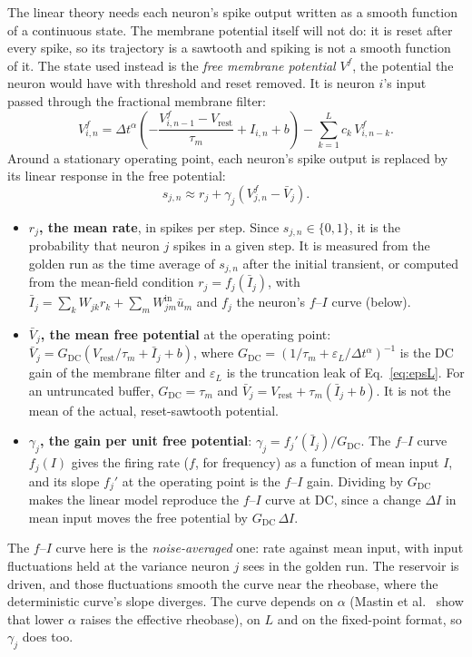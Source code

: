 \documentclass[11pt,a4paper]{article}
\begin{document}
The linear theory needs each neuron's spike output written as a smooth function of a continuous state. The membrane potential itself will not do: it is reset after every spike, so its trajectory is a sawtooth and spiking is not a smooth function of it. The state used instead is the \emph{free membrane potential} $V^{f}$, the potential the neuron would have with threshold and reset removed. It is neuron $i$'s input passed through the fractional membrane filter:
\begin{equation}
V^{f}_{i,n} = \Delta t^{\alpha}\left( -\frac{V^{f}_{i,n-1} - V_{\mathrm{rest}}}{\tau_m} + I_{i,n} + b \right) - \sum_{k=1}^{L} c_k \, V^{f}_{i,n-k}.
\label{eq:vfree}
\end{equation}
Around a stationary operating point, each neuron's spike output is replaced by its linear response in the free potential:
\begin{equation}
s_{j,n} \approx r_j + \gamma_j \left( V^{f}_{j,n} - \bar V_j \right).
\label{eq:spikelin}
\end{equation}
\begin{itemize}
  \item \textbf{$r_j$, the mean rate}, in spikes per step. Since $s_{j,n} \in \{0,1\}$, it is the probability that neuron $j$ spikes in a given step. It is measured from the golden run as the time average of $s_{j,n}$ after the initial transient, or computed from the mean-field condition $r_j = f_j(\bar I_j)$, with $\bar I_j = \sum_k W_{jk} r_k + \sum_m W^{\mathrm{in}}_{jm} \bar u_m$ and $f_j$ the neuron's $f$--$I$ curve (below).
  \item \textbf{$\bar V_j$, the mean free potential} at the operating point: $\bar V_j = G_{\mathrm{DC}} \left( V_{\mathrm{rest}}/\tau_m + \bar I_j + b \right)$, where $G_{\mathrm{DC}} = \left( 1/\tau_m + \varepsilon_L/\Delta t^{\alpha} \right)^{-1}$ is the DC gain of the membrane filter and $\varepsilon_L$ is the truncation leak of Eq.~\eqref{eq:epsL}. For an untruncated buffer, $G_{\mathrm{DC}} = \tau_m$ and $\bar V_j = V_{\mathrm{rest}} + \tau_m (\bar I_j + b)$. It is not the mean of the actual, reset-sawtooth potential.
  \item \textbf{$\gamma_j$, the gain per unit free potential}: $\gamma_j = f_j'(\bar I_j) / G_{\mathrm{DC}}$. The $f$--$I$ curve $f_j(I)$ gives the firing rate ($f$, for frequency) as a function of mean input $I$, and its slope $f_j'$ at the operating point is the $f$--$I$ gain. Dividing by $G_{\mathrm{DC}}$ makes the linear model reproduce the $f$--$I$ curve at DC, since a change $\Delta I$ in mean input moves the free potential by $G_{\mathrm{DC}}\,\Delta I$.
\end{itemize}
The $f$--$I$ curve here is the \emph{noise-averaged} one: rate against mean input, with input fluctuations held at the variance neuron $j$ sees in the golden run. The reservoir is driven, and those fluctuations smooth the curve near the rheobase, where the deterministic curve's slope diverges. The curve depends on $\alpha$ (Mastin et al.~\cite{mastin2026} show that lower $\alpha$ raises the effective rheobase), on $L$ and on the fixed-point format, so $\gamma_j$ does too.
\end{document}
